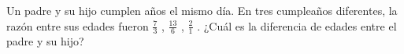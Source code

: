 Un padre y su hijo cumplen años el mismo día. En tres cumpleaños diferentes, la razón entre sus edades fueron $\frac 73$ , $\frac{13}{6}$ , $\frac 21$ . ¿Cuál es la diferencia de edades entre el padre y su hijo?
